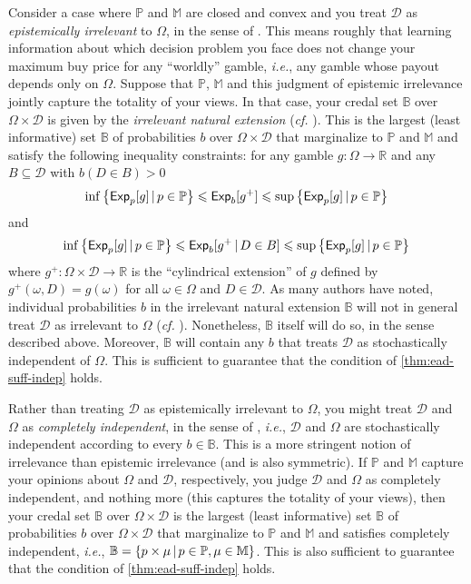\documentclass[a4paper]{article}
\newcommand\D{\mathcal{D}}
\renewcommand\P{\mathbb{P}} %
\newcommand\Exp{\mathsf{Exp}}
\newcommand{\IB}{\mathbb{B}}
\newcommand{\ID}{\mathbb{M}}
\newcommand{\IP}{\P}
\newcommand{\pb}{b}
\newcommand\SetDelimiter[1][]{
	\nonscript\,#1\vert \allowbreak \nonscript\,\mathopen{}}
\providecommand\given{\SetDelimiter}
\renewcommand{\leq}{\leqslant}
\newenvironment{CCM rewritten}
{\begingroup\color{blue}} %
{\endgroup}              %
\begin{document}
{Consider a case where $\IP$ and $\ID$ are closed and convex and you treat $\D$ as \textit{epistemically irrelevant} to $\Omega$, in the sense of \cite{walley1991srip}. This means roughly that learning information about which decision problem you face does not change your maximum buy price for any ``worldly'' gamble, \textit{i.e.}, any gamble whose payout depends only on $\Omega$. Suppose that $\IP$, $\ID$ and this judgment of epistemic irrelevance jointly capture the totality of your views. In that case, your credal set $\IB$ over $\Omega \times \D$ is given by the \textit{irrelevant natural extension} (\textit{cf.} \cite[Thm 13]{cooman2012}). This is the largest (least informative) set $\IB$ of probabilities $\pb$ over $\Omega \times \D$ that marginalize to $\IP$ and $\ID$ and satisfy the following inequality constraints: for any gamble $g:\Omega\rightarrow\mathbb{R}$ and any $B\subseteq\D$ with $b(D\in B)>0$
\[
\inf\left\{\Exp_p[g]\given p\in\IP\right\}\leq\Exp_b[g^+]\leq\sup\left\{\Exp_p[g]\given p\in\IP\right\}
\]
and
\[
\inf\left\{\Exp_p[g]\given p\in\IP\right\}\leq\Exp_b[g^+\given D\in B]\leq\sup\left\{\Exp_p[g]\given p\in\IP\right\}
\]
where $g^+:\Omega\times\D\rightarrow\mathbb{R}$ is the ``cylindrical extension'' of $g$ defined by $g^+(\omega,D)=g(\omega)$ for all $\omega\in\Omega$ and $D\in\D$. As many authors have noted, individual probabilities $\pb$ in the irrelevant natural extension $\IB$ will not in general treat $\D$ as irrelevant to $\Omega$ (\textit{cf.} \cite[pp. 96-7]{debock2019}). Nonetheless, $\IB$ itself will do so, in the sense described above. Moreover, $\IB$ will contain any $\pb$ that treats $\D$ as stochastically independent of $\Omega$. This is sufficient to guarantee that the condition of \cref{thm:ead-suff-indep} holds.

Rather than treating $\D$ as epistemically irrelevant to $\Omega$, you might treat $\D$ and $\Omega$ as \textit{completely independent}, in the sense of \cite{seidenfeld2007ci,cozman2012}, \textit{i.e.}, $\D$ and $\Omega$ are stochastically independent according to every $\pb\in\IB$. This is a more stringent notion of irrelevance than epistemic irrelevance (and is also symmetric). If $\IP$ and $\ID$ capture your opinions about $\Omega$ and $\D$, respectively, you judge $\D$ and $\Omega$ as completely independent, and nothing more (this captures the totality of your views), then your credal set $\IB$ over $\Omega \times \D$ is the largest (least informative) set $\IB$ of probabilities $\pb$ over $\Omega \times \D$ that marginalize to $\IP$ and $\ID$ and satisfies completely independent, \textit{i.e.}, $\IB=\left\{p\times\mu\given p\in\IP, \mu\in\ID\right\}$. This is also sufficient to guarantee that the condition of \cref{thm:ead-suff-indep} holds.}
\end{document}
